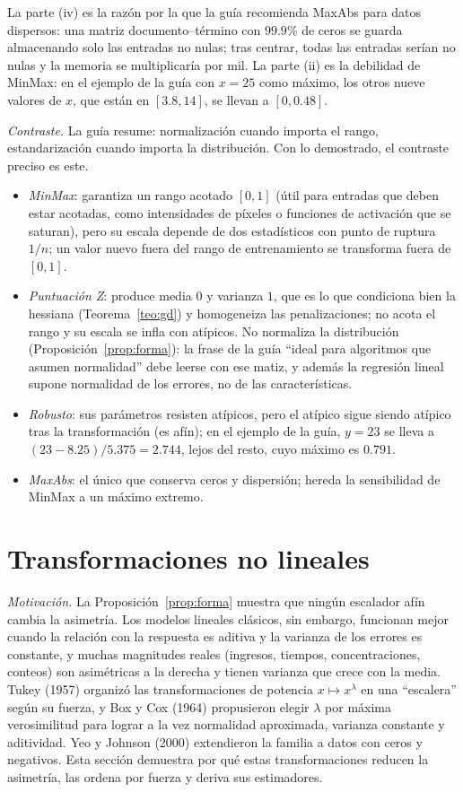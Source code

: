 \documentclass[11pt]{article}
\theoremstyle{definition}
\theoremstyle{remark}
\begin{document}
\noindent La parte (iv) es la razón por la que la guía recomienda MaxAbs para datos dispersos: una matriz documento--término con $99.9\%$ de ceros se guarda almacenando solo las entradas no nulas; tras centrar, todas las entradas serían no nulas y la memoria se multiplicaría por mil. La parte (ii) es la debilidad de MinMax: en el ejemplo de la guía con $x=25$ como máximo, los otros nueve valores de $x$, que están en $[3.8,14]$, se llevan a $[0,0.48]$.

\medskip

\noindent \emph{Contraste.} La guía resume: normalización cuando importa el rango, estandarización cuando importa la distribución. Con lo demostrado, el contraste preciso es este.
\begin{itemize}
\item \emph{MinMax}: garantiza un rango acotado $[0,1]$ (útil para entradas que deben estar acotadas, como intensidades de píxeles o funciones de activación que se saturan), pero su escala depende de dos estadísticos con punto de ruptura $1/n$; un valor nuevo fuera del rango de entrenamiento se transforma fuera de $[0,1]$.
\item \emph{Puntuación Z}: produce media $0$ y varianza $1$, que es lo que condiciona bien la hessiana (Teorema~\ref{teo:gd}) y homogeneiza las penalizaciones; no acota el rango y su escala se infla con atípicos. No normaliza la distribución (Proposición~\ref{prop:forma}): la frase de la guía ``ideal para algoritmos que asumen normalidad'' debe leerse con ese matiz, y además la regresión lineal supone normalidad de los errores, no de las características.
\item \emph{Robusto}: sus parámetros resisten atípicos, pero el atípico sigue siendo atípico tras la transformación (es afín); en el ejemplo de la guía, $y=23$ se lleva a $(23-8.25)/5.375=2.744$, lejos del resto, cuyo máximo es $0.791$.
\item \emph{MaxAbs}: el único que conserva ceros y dispersión; hereda la sensibilidad de MinMax a un máximo extremo.
\end{itemize}

\section{Transformaciones no lineales}\label{sec:nolineales}

\noindent \emph{Motivación.} La Proposición~\ref{prop:forma} muestra que ningún escalador afín cambia la asimetría. Los modelos lineales clásicos, sin embargo, funcionan mejor cuando la relación con la respuesta es aditiva y la varianza de los errores es constante, y muchas magnitudes reales (ingresos, tiempos, concentraciones, conteos) son asimétricas a la derecha y tienen varianza que crece con la media. Tukey (1957) organizó las transformaciones de potencia $x\mapsto x^\lambda$ en una ``escalera'' según su fuerza, y Box y Cox (1964) propusieron elegir $\lambda$ por máxima verosimilitud para lograr a la vez normalidad aproximada, varianza constante y aditividad. Yeo y Johnson (2000) extendieron la familia a datos con ceros y negativos. Esta sección demuestra por qué estas transformaciones reducen la asimetría, las ordena por fuerza y deriva sus estimadores.
\end{document}
